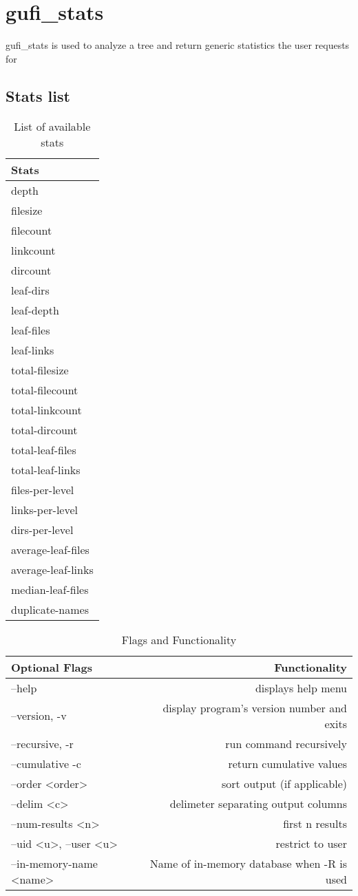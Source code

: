 \section{gufi\_stats}
gufi\_stats is used to analyze a tree and return generic statistics the user requests for

\subsection{Stats list}
\begin{table} [h]
\centering
\begin{tabular}{l}
Stats\\\hline
depth \\
filesize \\
filecount \\
linkcount \\
dircount \\
leaf-dirs \\
leaf-depth \\
leaf-files \\
leaf-links \\
total-filesize \\
total-filecount \\
total-linkcount \\
total-dircount \\
total-leaf-files \\
total-leaf-links \\
files-per-level \\ 
links-per-level \\
dirs-per-level \\
average-leaf-files \\
average-leaf-links \\ 
median-leaf-files \\
duplicate-names
\end{tabular}
\caption{\label{fig:stat_options}List of available stats}
\end{table}

\begin{table} [h]
\centering
\begin{tabular}{l|r}
Optional Flags & Functionality\\\hline
--help & displays help menu\\ 
--version, -v & display program's version number and exits \\
--recursive, -r & run command recursively \\
--cumulative -c & return cumulative values \\
--order \textless order\textgreater & sort output (if applicable)\\
--delim \textless c\textgreater & delimeter separating output columns\\
--num-results \textless n\textgreater & first n results \\
--uid \textless u\textgreater, --user \textless u\textgreater & restrict to user \\
--in-memory-name \textless name\textgreater & Name of in-memory database when -R is used
\end{tabular}
\caption{\label{fig:gufi_stats_flags}Flags and Functionality}
\end{table}

